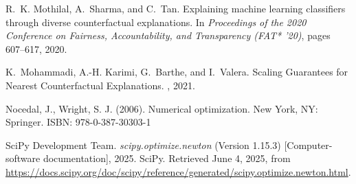 \documentclass[12pt]{extarticle}
\numberwithin{equation}{section}
\begin{document}
\begin{thebibliography}{99}
R.~K. Mothilal, A.~Sharma, and C.~Tan.
\newblock Explaining machine learning classifiers through diverse counterfactual explanations.
\newblock In {\em Proceedings of the 2020 Conference on Fairness, Accountability, and Transparency (FAT* '20)}, pages 607--617, 2020.

K.~Mohammadi, A.-H. Karimi, G.~Barthe, and I.~Valera.
\newblock Scaling Guarantees for Nearest Counterfactual Explanations.
, 2021.

Nocedal, J., Wright, S. J. (2006). Numerical optimization.
\newblock New York, NY: Springer. ISBN: 978-0-387-30303-1
 
SciPy Development Team.
\newblock \textit{scipy.optimize.newton} (Version 1.15.3) [Computer-software documentation], 2025.
\newblock SciPy. Retrieved June 4, 2025, from \url{https://docs.scipy.org/doc/scipy/reference/generated/scipy.optimize.newton.html}.

\end{thebibliography}
\end{document}

